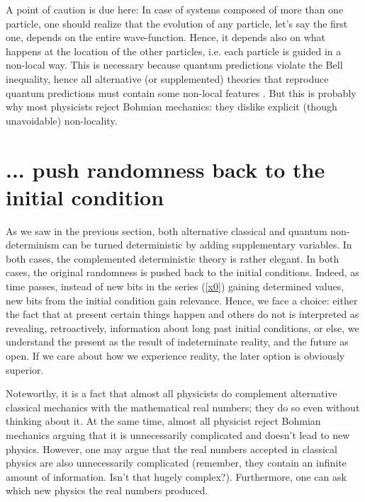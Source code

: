 \documentclass[floatfix,12pt]{article}
\begin{document}
A point of caution is due here: In case of systems composed of more than one particle, one should realize that the evolution of any particle, let's say the first one, depends on the entire wave-function. Hence, it depends also on what happens at the location of the other particles, i.e. each particle is guided in a non-local way. This is necessary because quantum predictions violate the Bell inequality, hence all alternative (or supplemented) theories that reproduce quantum predictions must contain some non-local features \cite{Bellspeakable, BrunnerRMP14, GisinQchance14}. But this is probably why most physicists reject Bohmian mechanics: they dislike explicit (though unavoidable) non-locality.


\section{... push randomness back to the initial condition}\label{suppvar2}
As we saw in the previous section, both alternative classical and quantum non-determinism can be turned deterministic by adding supplementary variables. In both cases, the complemented deterministic theory is rather elegant. In both cases, the original randomness is pushed back to the initial conditions. 
Indeed, as time passes, instead of new bits in the series (\ref{x0}) gaining determined values, new bits from the initial condition gain relevance. Hence, we face a choice: either the fact that at present certain things happen and others do not is interpreted as revealing, retroactively, information about long past initial conditions, or else, we understand the present as the result of indeterminate reality, and the future as open. If we care about how we experience reality, the later option is obviously superior.   

Noteworthy, it is a fact that almost all physicists do complement alternative classical mechanics with the mathematical real numbers; they do so even without thinking about it. At the same time, almost all physicist reject Bohmian mechanics arguing that it is unnecessarily complicated and doesn't lead to new physics. However, one may argue that the real numbers accepted in classical physics are also unnecessarily complicated (remember, they contain an infinite amount of information. Isn't that hugely complex?). Furthermore, one can ask which new physics the real numbers produced.
\end{document}
